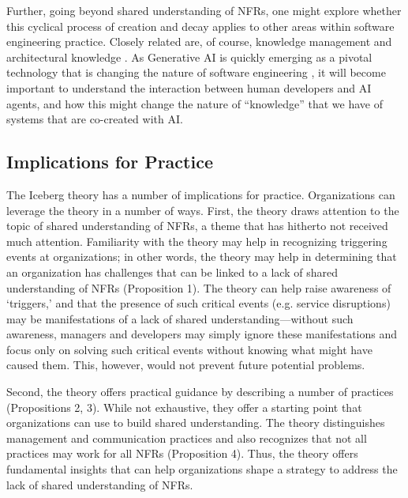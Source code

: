 \documentclass[smallextended]{svjour3}        %
\providecommand{\DIFaddtex}[1]{{\protect\color{blue}\uwave{#1}}} %
\providecommand{\DIFaddbegin}{} %
\providecommand{\DIFaddend}{} %
\providecommand{\DIFadd}[1]{\texorpdfstring{\DIFaddtex{#1}}{#1}} %
\newcommand{\DIFaddincludegraphics}[2][]{{\color{blue}\fbox{\DIFOincludegraphics[#1]{#2}}}} %
\DeclareRobustCommand{\DIFaddbegin}{\DIFOaddbegin \let\includegraphics\DIFaddincludegraphics} %
\DeclareRobustCommand{\DIFaddend}{\DIFOaddend \let\includegraphics\DIFOincludegraphics} %
\begin{document}
Further, going beyond shared understanding of NFRs, one might explore whether this cyclical process of creation and decay applies to other areas within software engineering practice. Closely related are, of course, knowledge management \citep{bjornson2008knowledge} and architectural knowledge \citep{capilla2016}. As Generative AI is quickly emerging as a pivotal technology that is changing the nature of software engineering \DIFaddbegin \DIFadd{\mbox{%
\citep{stray2025genai}}\hskip0pt%
}\DIFaddend , it will become important to understand the interaction between human developers and AI agents, and how this might change the nature of ``knowledge'' that we have of systems that are co-created with AI. 


\subsection{Implications for Practice}
\label{sec:practical}

The Iceberg theory has a number of implications for practice. 
Organizations can leverage the theory in a number of ways. 
First, the theory draws attention to the topic of shared understanding of NFRs, a theme that has hitherto not received much attention. Familiarity with the theory may help in recognizing triggering events at organizations; in other words, the theory may help in determining that an organization has challenges that can be linked to a lack of shared understanding of NFRs (Proposition 1). 
The theory can help raise awareness of `triggers,' and that the presence of such critical events (e.g. service disruptions) may be manifestations of a lack of shared understanding---without such awareness, managers and developers may simply ignore these manifestations and focus only on solving such critical events without knowing what might have caused them. This, however, would not prevent future potential problems.

Second, the theory offers practical guidance by describing a number of practices (Propositions 2, 3). While not exhaustive, they offer a starting point that organizations can use to build shared understanding. The theory distinguishes management and communication practices and also recognizes that not all practices may work for all NFRs (Proposition 4). Thus, the theory offers fundamental insights that can help organizations shape a strategy to address the lack of shared understanding of NFRs. 
\end{document}
